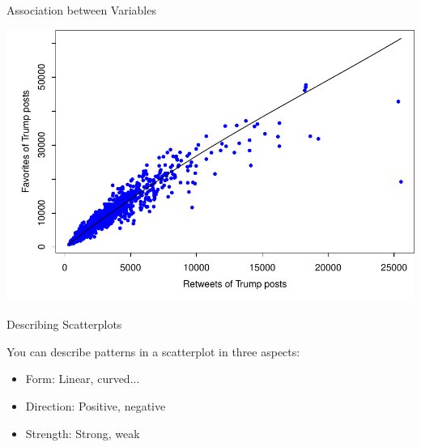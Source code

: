 \documentclass{beamer}\usepackage[]{graphicx}\usepackage[]{color}
\newenvironment{knitrout}{}{} %
\renewenvironment{knitrout}{\begin{spacing}{0.75}\begin{tiny}}{\end{tiny}\end{spacing}}
\begin{document}
\begin{frame}{Association between Variables}

\begin{knitrout}\small
{}\color{fgcolor}

{\centering \includegraphics[width=0.99\linewidth]{figure/graphics-scatter_2-1} 

}



\end{knitrout}
\end{frame}



\begin{frame}{Describing Scatterplots}

You can describe patterns in a scatterplot in three aspects:
\begin{itemize}
\item Form: Linear, curved...
\item Direction: Positive, negative
\item Strength: Strong, weak
\end{itemize}
\end{frame}
\end{document}
